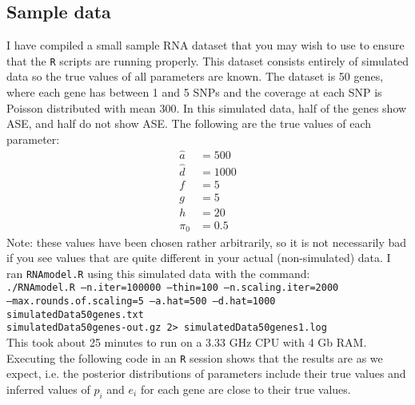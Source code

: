 \documentclass[12pt,]{article}
\begin{document}
\subsection{Sample data}
I have compiled a small sample RNA dataset that you may wish to use to ensure that the {\tt R}
scripts are running properly. This dataset consists entirely of simulated data so the true
values of all parameters are known. The dataset is 50 genes, where each gene has between
1 and 5 SNPs and the coverage at each SNP is Poisson distributed with mean 300. In this
simulated data, half of the genes show ASE, and half do not show ASE. The following are the 
true values of each parameter:
\begin{align*}
\hat{a} &= 500 \\
\hat{d} &= 1000 \\
f &= 5 \\
g &= 5 \\
h &= 20 \\
\pi_0 &= 0.5
\end{align*}
Note: these values have been chosen rather arbitrarily, so it is not necessarily bad if you see
values that are quite different in your actual (non-simulated) data.
I ran {\tt RNAmodel.R} using this simulated data with the command:\\
{\tt ./RNAmodel.R --n.iter=100000 --thin=100 --n.scaling.iter=2000 \\
--max.rounds.of.scaling=5 --a.hat=500 --d.hat=1000  simulatedData50genes.txt 
\\ simulatedData50genes-out.gz 2> simulatedData50genes1.log}\\
This took about 25 minutes to run on a 3.33 GHz CPU with 4 Gb RAM.
Executing the following code in an {\tt R} session shows that the results are as we
expect, i.e. the posterior distributions of parameters include their true values and inferred
values of $p_i$ and $e_i$ for each gene are close to their true values. \\
\end{document}
